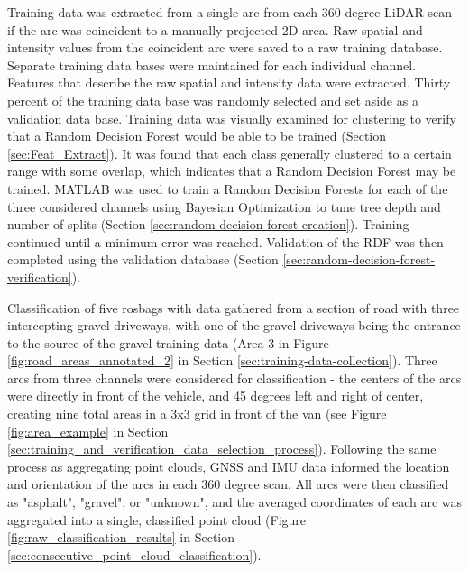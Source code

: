 \documentclass[numbered,pdftex]{ohio-etd}
\begin{document}
{		{Training data was extracted from a single arc from each 360 degree LiDAR scan if the arc was coincident to a manually projected 2D area. Raw spatial and intensity values from the coincident arc were saved to a raw training database. Separate training data bases were maintained for each individual channel. Features that describe the raw spatial and intensity data were extracted. Thirty percent of the training data base was randomly selected and set aside as a validation data base. Training data was visually examined for clustering to verify that a Random Decision Forest would be able to be trained (Section \ref{sec:Feat_Extract}). It was found that each class generally clustered to a certain range with some overlap, which indicates that a Random Decision Forest may be trained. MATLAB was used to train a Random Decision Forests for each of the three considered channels using Bayesian Optimization to tune tree depth and number of splits (Section \ref{sec:random-decision-forest-creation}). Training continued until a minimum error was reached. Validation of the RDF was then completed using the validation database (Section \ref{sec:random-decision-forest-verification}).}
		
		{Classification of five rosbags with data gathered from a section of road with three intercepting gravel driveways, with one of the gravel driveways being the entrance to the source of the gravel training data (Area $3$ in Figure \ref{fig:road_areas_annotated_2} in Section \ref{sec:training-data-collection}). Three arcs from three channels were considered for classification - the centers of the arcs were directly in front of the vehicle, and 45 degrees left and right of center, creating nine total areas in a 3x3 grid in front of the van (see Figure \ref{fig:area_example} in Section \ref{sec:training_and_verification_data_selection_process}). Following the same process as aggregating point clouds, GNSS and IMU data informed the location and orientation of the arcs in each 360 degree scan. All arcs were then classified as "asphalt", "gravel", or "unknown", and the averaged coordinates of each arc was aggregated into a single, classified point cloud (Figure \ref{fig:raw_classification_results} in Section \ref{sec:consecutive_point_cloud_classification}).}
		
}
\end{document}
